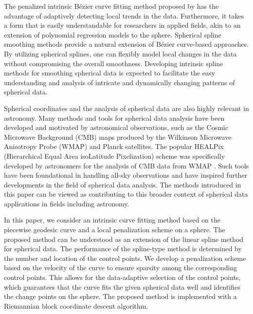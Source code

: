 The penalized intrinsic Bézier curve fitting method proposed by \citet{bak2023intrinsic} has the advantage of adaptively detecting local trends in the data. Furthermore, it takes a form that is easily understandable for researchers in applied fields, akin to an extension of polynomial regression models to the sphere. Spherical spline smoothing methods provide a natural extension of Bézier curve-based approaches. By utilizing spherical splines, one can flexibly model local changes in the data without compromising the overall smoothness. Developing intrinsic spline methods for smoothing spherical data is expected to facilitate the easy understanding and analysis of intricate and dynamically changing patterns of spherical data.

Spherical coordinates and the analysis of spherical data are also highly relevant in astronomy. Many methods and tools for spherical data analysis have been developed and motivated by astronomical observations, such as the Cosmic Microwave Background (CMB) maps produced by the Wilkinson Microwave Anisotropy Probe (WMAP) and Planck satellites. The popular HEALPix (Hierarchical Equal Area isoLatitude Pixelization) scheme was specifically developed by astronomers for the analysis of CMB data from WMAP \citep{gorski2005healpix}. Such tools have been foundational in handling all-sky observations and have inspired further developments in the field of spherical data analysis. The methods introduced in this paper can be viewed as contributing to this broader context of spherical data applications in fields including astronomy.

In this paper, we consider an intrinsic curve fitting method based on the piecewise geodesic curve and a local penalization scheme on a sphere. The proposed method can be understood as an extension of the linear spline method for spherical data. The performance of the spline-type method is determined by the number and location of the control points. We develop a penalization scheme based on the velocity of the curve to ensure sparsity among the corresponding control points. This allows for the data-adaptive selection of the control points, which guarantees that the curve fits the given spherical data well and identifies the change points on the sphere. The proposed method is implemented with a Riemannian block coordinate descent algorithm.

